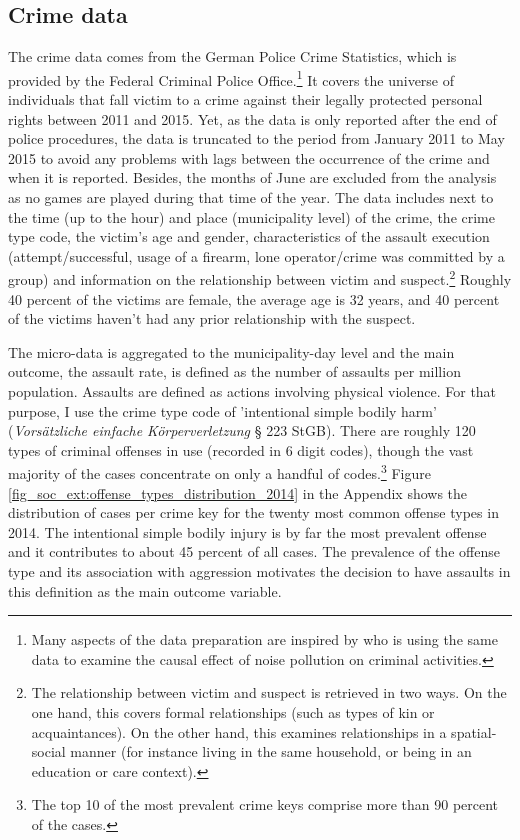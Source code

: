 \subsection{Crime data}
The crime data comes from the German Police Crime Statistics, which is provided by the Federal Criminal Police Office.\footnote{Many aspects of the data preparation are inspired by \cite{hener2019noise} who is using the same data to examine the causal effect of noise pollution on criminal activities.} It covers the universe of individuals that fall victim to a crime against their legally protected personal rights between 2011 and 2015. Yet, as the data is only reported after the end of police procedures, the data is truncated to the period from January 2011 to May 2015 to avoid any problems with lags between the occurrence of the crime and when it is reported. Besides, the months of June are excluded from the analysis as no games are played during that time of the year. The data includes next to the time (up to the hour) and place (municipality level) of the crime, the crime type code, the victim's age and gender, characteristics of the assault execution (attempt/successful, usage of a firearm, lone operator/crime was committed by a group) and information on the relationship between victim and suspect.\footnote{The relationship between victim and suspect is retrieved in two ways. On the one hand, this covers formal relationships (such as types of kin or acquaintances). On the other hand, this examines relationships in a spatial-social manner (for instance living in the same household, or being in an education or care context).} Roughly 40 percent of the victims are female, the average age is 32 years, and 40 percent of the victims haven't had any prior relationship with the suspect.



The micro-data is aggregated to the municipality-day level and the main outcome, the assault rate, is defined as the number of assaults per million population. Assaults are defined as actions involving physical violence. For that purpose, I use the crime type code of 'intentional simple bodily harm' (\textit{Vorsätzliche einfache Körperverletzung} § 223 StGB). There are roughly 120 types of criminal offenses in use (recorded in 6 digit codes), though the vast majority of the cases concentrate on only a handful of codes.\footnote{The top 10 of the most prevalent crime keys comprise more than 90 percent of the cases.} Figure \ref{fig_soc_ext:offense_types_distribution_2014} in the Appendix shows the distribution of cases per crime key for the twenty most common offense types in 2014. The intentional simple bodily injury is by far the most prevalent offense and it contributes to about 45 percent of all cases. The prevalence of the offense type and its association with aggression motivates the decision to have assaults in this definition as the main outcome variable.

